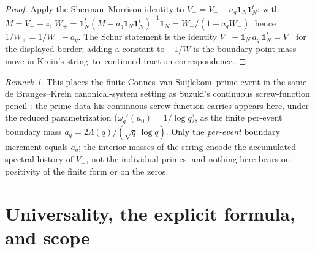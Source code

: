 \documentclass[11pt]{article}
\theoremstyle{plain}
\theoremstyle{definition}
\theoremstyle{remark}
\newtheorem{remark}[theorem]{Remark}
\newcommand{\cvs}{Connes--van Suijlekom}
\newcommand{\one}{\mathbf 1}
\newcommand{\Lam}{\Lambda}
\begin{document}
\begin{proof}
Apply the Sherman--Morrison identity to $V_+=V_--a_q\one_N\one_N^t$: with
$M=V_--z$, $W_+=\one_N^t(M-a_q\one_N\one_N^t)^{-1}\one_N=W_-/(1-a_qW_-)$, hence
$1/W_+=1/W_--a_q$. The Schur statement is the identity
$V_--\one_N\,a_q\,\one_N^t=V_+$ for the displayed border; adding a constant to
$-1/W$ is the boundary point-mass move in Krein's string--to--continued-fraction
correspondence.
\end{proof}

\begin{remark}
This places the finite \cvs\ prime event in the same de Branges--Krein
canonical-system setting as Suzuki's continuous screw-function pencil
\cite{Suzuki2026}: the prime data his continuous screw function carries appears
here, under the reduced parametrization ($\omega_q'(u_0)=1/\log q$), as the finite
per-event boundary mass $a_q=2\Lam(q)/(\sqrt q\,\log q)$. Only the \emph{per-event} boundary
increment equals $a_q$; the interior masses of the string encode the accumulated
spectral history of $V_-$, not the individual primes, and nothing here bears on
positivity of the finite form or on the zeros.
\end{remark}

\section{Universality, the explicit formula, and scope}\label{sec:scope}
\end{document}

